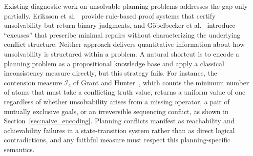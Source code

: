 Existing diagnostic work on unsolvable planning problems addresses the gap only partially. Eriksson et al.~\cite{Eriksson2018} provide rule-based proof systems that certify unsolvability but return binary judgments, and G{\"o}belbecker et al.~\cite{Goebelbecker2010} introduce ``excuses'' that prescribe minimal repairs without characterizing the underlying conflict structure. Neither approach delivers quantitative information about how unsolvability is structured within a problem. A natural shortcut is to encode a planning problem as a propositional knowledge base and apply a classical inconsistency measure directly, but this strategy fails. For instance, the contension measure $\mathcal{I}_c$ of Grant and Hunter~\cite{Grant2011}, which counts the minimum number of atoms that must take a conflicting truth value, returns a uniform value of one regardless of whether unsolvability arises from a missing operator, a pair of mutually exclusive goals, or an irreversible sequencing conflict, as shown in Section~\ref{sec:naive_encoding}. Planning conflicts manifest as reachability and achievability failures in a state-transition system rather than as direct logical contradictions, and any faithful measure must respect this planning-specific semantics.

